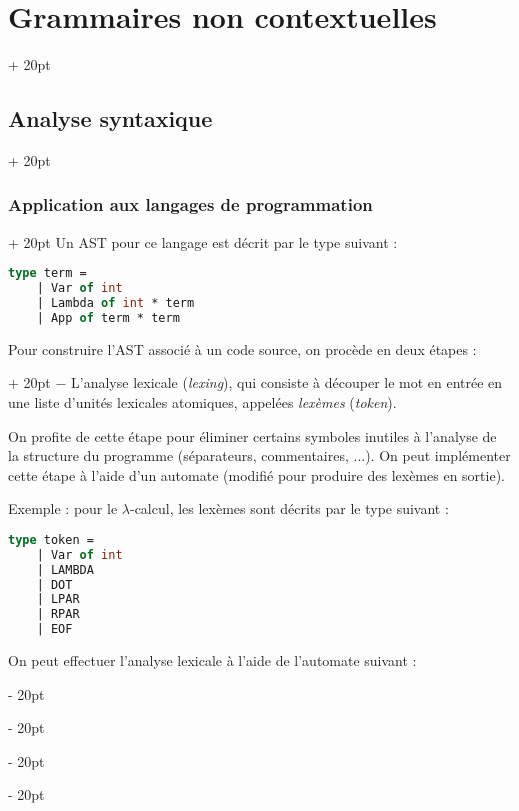 \documentclass[a4paper, 12pt, twoside]{article}
\newcommand{\ind}[1][20pt]{\advance\leftskip + #1}
\newcommand{\deind}[1][20pt]{\advance\leftskip - #1}
\newenvironment{indt}[2][20pt]{#2 \par \ind[#1]}{\par \deind} %
\begin{document}
\begin{indt}{\section{Grammaires non contextuelles}}
\begin{indt}{\subsection{Analyse syntaxique}}
\begin{indt}{\subsubsection{Application aux langages de programmation}}
                Un AST pour ce langage est décrit par le type suivant :
                \begin{lstlisting}[language=Caml, xleftmargin=80pt]
type term =
    | Var of int
    | Lambda of int * term
    | App of term * term\end{lstlisting}

                \vspace{6pt}
                
                \begin{indt}{Pour construire l'AST associé à un code source, on procède en deux étapes :}
                    $-$ L'analyse lexicale (\textit{lexing}), qui consiste à découper le mot en entrée en une liste d'unités lexicales atomiques, appelées \emph{lexèmes} (\textit{token}).

                    On profite de cette étape pour éliminer certains symboles inutiles à l'analyse de la structure du programme (séparateurs, commentaires, ...).
                    On peut implémenter cette étape à l'aide d'un automate (modifié pour produire des lexèmes en sortie).

                    \vspace{6pt}
                    
                    Exemple : pour le $\lambda$-calcul, les lexèmes sont décrits par le type suivant :
                    \begin{lstlisting}[language=Caml, xleftmargin=100pt]
type token =
    | Var of int
    | LAMBDA
    | DOT
    | LPAR
    | RPAR
    | EOF\end{lstlisting}

                    On peut effectuer l'analyse lexicale à l'aide de l'automate suivant :



\end{indt}
\end{indt}
\end{indt}
\end{indt}
\end{document}
